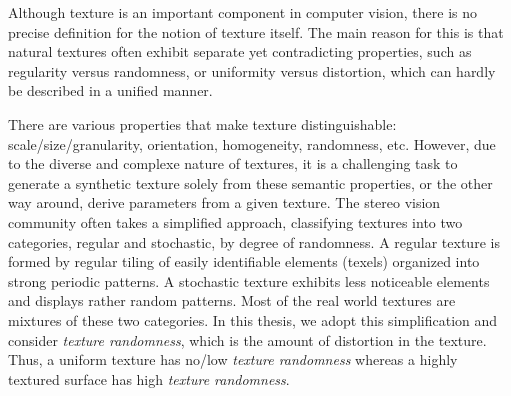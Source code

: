 Although texture is an important component in computer vision, there is no precise definition for the notion of texture itself. The main reason for this is that natural textures often exhibit separate yet contradicting properties, such as regularity versus randomness, or uniformity versus distortion, which can hardly be described in a unified manner. 


There are various properties that make texture distinguishable: scale/size/granularity, orientation, homogeneity, randomness, etc. However, due to the diverse and complexe nature of textures, it is a challenging task to generate a synthetic texture solely from these semantic properties, or the other way around, derive parameters from a given texture. The stereo vision community often takes a simplified approach, classifying textures into two categories, regular and stochastic, by degree of randomness. A regular texture is formed by regular tiling of easily identifiable elements (texels) organized into strong periodic patterns. A stochastic texture exhibits less noticeable elements and displays rather random patterns. Most of the real world textures are mixtures of these two categories. In this thesis, we adopt this simplification and consider \textit{texture randomness}, which is the amount of distortion in the texture. Thus, a uniform texture has no/low \textit{texture randomness} whereas a highly textured surface has high \textit{texture randomness}.

